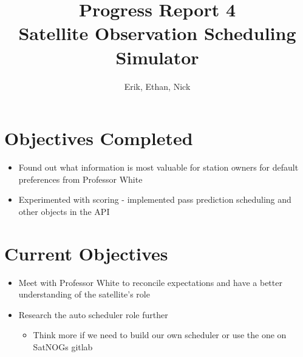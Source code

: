 \documentclass{article}
\title{Progress Report 4\\ Satellite Observation Scheduling Simulator}
\author{Erik, Ethan, Nick}
\begin{document}
\maketitle

\section{Objectives Completed}

\begin{itemize}
	\item Found out what information is most valuable for station owners for default preferences from Professor White
	\item Experimented with scoring - implemented pass prediction scheduling and other objects in the API
\end{itemize}

\section{Current Objectives}

\begin{itemize}
  \item Meet with Professor White to reconcile expectations and have a better understanding of the satellite's role
  \item Research the auto scheduler role further
  \begin{itemize}
      \item Think more if we need to build our own scheduler or use the one on SatNOGs gitlab
  \end{itemize}
\end{itemize}
\end{document}
